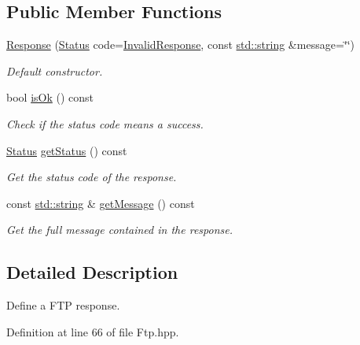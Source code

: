 \subsection*{Public Member Functions}
\begin{DoxyCompactItemize}
\item 
\hyperlink{classsf_1_1_ftp_1_1_response_af300fffd4862774102f978eb22f85d9b}{Response} (\hyperlink{classsf_1_1_ftp_1_1_response_af81738f06b6f571761696291276acb3b}{Status} code=\hyperlink{classsf_1_1_ftp_1_1_response_af81738f06b6f571761696291276acb3ba59e041e4ef186e8ae8d6035973fc46bd}{Invalid\-Response}, const \hyperlink{gl3_8h_ac83513893df92266f79a515488701770}{std\-::string} \&message=\char`\"{}\char`\"{})
\begin{DoxyCompactList}\small\item\em Default constructor. \end{DoxyCompactList}\item 
bool \hyperlink{classsf_1_1_ftp_1_1_response_a4dadbe0fe0a3ef2d571a017e1645e675}{is\-Ok} () const 
\begin{DoxyCompactList}\small\item\em Check if the status code means a success. \end{DoxyCompactList}\item 
\hyperlink{classsf_1_1_ftp_1_1_response_af81738f06b6f571761696291276acb3b}{Status} \hyperlink{classsf_1_1_ftp_1_1_response_ac7f937b3883d1c4fbc75c003a1786aaa}{get\-Status} () const 
\begin{DoxyCompactList}\small\item\em Get the status code of the response. \end{DoxyCompactList}\item 
const \hyperlink{gl3_8h_ac83513893df92266f79a515488701770}{std\-::string} \& \hyperlink{classsf_1_1_ftp_1_1_response_a0015675c528a4a84a671484b9e5499d6}{get\-Message} () const 
\begin{DoxyCompactList}\small\item\em Get the full message contained in the response. \end{DoxyCompactList}\end{DoxyCompactItemize}


\subsection{Detailed Description}
Define a F\-T\-P response. 

Definition at line 66 of file Ftp.\-hpp.



